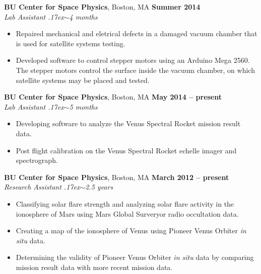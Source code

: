 \documentclass[margin,line]{resume}
\newcommand{\about}{\raise.17ex\hbox{$\scriptstyle\mathtt{\sim}$}}
\begin{document}
\begin{resume}
    \textbf{BU Center for Space Physics}, Boston, MA \hfill \textbf{Summer 2014} \\
    \textsl{Lab Assistant \hfill \about 4 months}
    \vspace{1mm}
    \begin{itemize}[leftmargin=2em]
        \item Repaired mechanical and eletrical defects in a damaged vacuum
        chamber that is used for satellite systems testing.
        \item Developed software to control stepper motors using an Arduino Mega
        2560. The stepper motors control the surface inside the vacuum chamber, on
        which satellite systems may be placed and tested.
    \end{itemize}
    
    \textbf{BU Center for Space Physics}, Boston, MA \hfill \textbf{May 2014 -- present} \\
    \textsl{Lab Assistant \hfill \about 5 months}
    \vspace{1mm}
    \begin{itemize}[leftmargin=2em]
        \item Developing software to analyze the Venus Spectral Rocket mission result data.
        \item Post flight calibration on the Venus Spectral Rocket echelle imager and spectrograph.
    \end{itemize}
    
    \textbf{BU Center for Space Physics}, Boston, MA \hfill \textbf{March 2012 -- present} \\
    \textsl{Research Assistant \hfill \about 2.5 years}
    \vspace{1mm}
    \begin{itemize}[leftmargin=2em]
        \item Classifying solar flare strength and analyzing solar flare activity in
        the ionosphere of Mars using Mars Global Surveryor radio occultation data.
        \item Creating a map of the ionosphere of Venus using Pioneer Venus Orbiter
        {\it in situ} data.
        \item Determining the validity of Pioneer Venus Orbiter {\it in situ} data by
        comparing mission result data with more recent mission data.
    \end{itemize}
        

\end{resume}
\end{document}
